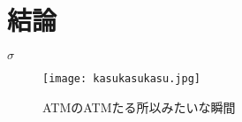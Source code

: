 \section{結論}

\begin{center}
  { $\sigma$}
\end{center}

\begin{figure}[H]
  \centering
  \texttt{[image: kasukasukasu.jpg]}
    \caption{ATMのATMたる所以みたいな瞬間}
    \label{kasukasukasu}
\end{figure}
